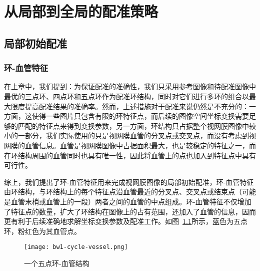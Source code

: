 
\chapter{从局部到全局的配准策略}
\label{cha4}

\section{局部初始配准}
\subsection{环-血管特征}
在上章中，我们提到：为保证配准的准确性，我们只采用参考图像和待配准图像中最优的三点环、四点环和五点环作为配准环结构，同时对它们进行多环的组合以最大限度提高配准结果的准确率。然而，上述措施对于配准来说仍然是不充分的：一方面，这使得一些图片只包含有限的环特征点，而后续的图像空间坐标变换需要足够的匹配的特征点来得到变换参数，另一方面，环结构只占据整个视网膜图像中较小的一部分，我们实际使用的只是视网膜血管的分叉点或交叉点，而没有考虑到视网膜的血管信息。血管是视网膜图像中占据面积最大，也是较稳定的特征之一，而在环结构周围的血管同时也具有唯一性，因此将血管上的点也加入到特征点中具有可行性。

综上，我们提出了环-血管特征用来完成视网膜图像的局部初始配准，环-血管特征由环结构，与环结构上的每个特征点沿血管最近的分叉点、交叉点或结束点（可能是血管末梢或血管上的一段）两者之间的血管的中点组成。环-血管特征不仅增加了特征点的数量，扩大了环结构在图像上的占有范围，还加入了血管的信息，因而更有利于后续准确地求解坐标变换参数及配准工作。如图~\ref{5bifur-vess}所示，蓝色为五点环，粉红色为其血管点。
   \begin{figure}[ht!]
   \centering
  \texttt{[image: bw1-cycle-vessel.png]}
  \caption{一个五点环-血管结构}
    \label{5bifur-vess}
 \end{figure}
 

